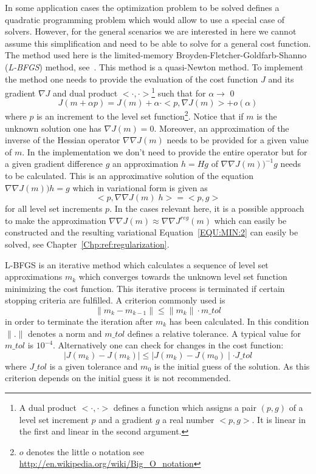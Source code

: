 In some application cases the optimization problem to be solved defines a
quadratic programming problem which would allow to use a special case of
solvers.
However, for the general scenarios we are interested in here we cannot assume
this simplification and need to be able to solve for a general cost function.
The method used here is the limited-memory Broyden-Fletcher-Goldfarb-Shanno
(\emph{L-BFGS}) method, see~\cite{Nocedal1980}.
This method is a quasi-Newton method.
To implement the method one needs to provide the evaluation of the cost
function $J$ and its gradient $\nabla J$ and dual product $<\cdot,\cdot>$\footnote{A
dual product $<\cdot,\cdot>$ defines a function which assigns a pair $(p,g)$ of a level
set increment $p$ and a gradient $g$ a real number $<p,g>$. It is linear
in the first and linear in the second argument.}
such that for $\alpha \to$ 0 
\begin{equation}\label{EQU:MIN:1}
J(m+\alpha p) = J(m) + \alpha \cdot < p , \nabla J(m)> + o(\alpha)
\end{equation}  
where $p$ is an increment to the level set function\footnote{$o$ denotes the
little o notation see \url{http://en.wikipedia.org/wiki/Big_O_notation}}.
Notice that if $m$ is the unknown solution one has $\nabla J(m)=0$.
Moreover, an approximation of the inverse of the Hessian operator
$\nabla \nabla J(m)$ needs to be provided for a given value of $m$.
In the implementation we don't need to provide the entire operator but for a
given gradient difference $g$ an approximation $h=Hg$ of
$\nabla \nabla J(m))^{-1}g$ needs to be calculated.
This is an approximative solution of the equation $\nabla \nabla J(m)) h=g$
which in variational form is given as 
\begin{equation}\label{EQU:MIN:2}
<p, \nabla \nabla J(m)\; h > = <p, g>
\end{equation}
for all level set increments $p$.
In the cases relevant here, it is a possible approach to make the approximation
$\nabla \nabla J(m) \approx \nabla \nabla J^{reg}(m)$ which can easily be
constructed and the resulting variational Equation~\ref{EQU:MIN:2} can easily
be solved, see Chapter~\ref{Chp:ref:regularization}.

L-BFGS is an iterative method which calculates a sequence of level set
approximations $m_{k}$ which converges towards the unknown level set function
minimizing the cost function.
This iterative process is terminated if certain stopping criteria are fulfilled.
A criterion commonly used is
\begin{equation}\label{EQU:MIN:3a}
\| m_k - m_{k-1} \| \le \|m_k\| \cdot {m\_tol} 
\end{equation}
in order to terminate the iteration after $m_k$ has been calculated.
In this condition $\|.\|$ denotes a norm and $m\_tol$ defines a relative
tolerance. A typical value for $m\_tol$ is $10^{-4}$. Alternatively one can
check for changes in the cost function:
\begin{equation}\label{EQU:MIN:3b}
\mid J(m_k) - J(m_k) \mid \le \mid J(m_k) - J(m_0) \mid \cdot {J\_tol}  
\end{equation}
where ${J\_tol}$ is a given tolerance and $m_0$ is the initial guess of the solution.
As this criterion depends on the initial guess it is not recommended.

